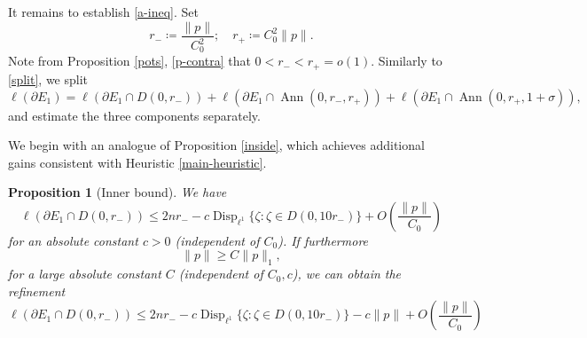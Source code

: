 \documentclass[12pt]{amsart}
\newtheorem{proposition}[theorem]{Proposition}
\newcommand{\Disp}{\operatorname{Disp}_{\ell^1}}
\newcommand{\Ann}{\operatorname{Ann}}
\begin{document}
It remains to establish \eqref{a-ineq}. Set
$$ r_- \coloneqq \frac{\|p\|}{C_0^2}; \quad r_+ \coloneqq C_0^2 \|p\|.$$
Note from Proposition \ref{pots}, \eqref{p-contra} that $0 < r_- < r_+ = o(1)$.
Similarly to \eqref{split}, we split
\begin{equation}\label{split-2}
 \ell(\partial E_1) = \ell(\partial E_1 \cap D(0,r_-)) + \ell(\partial E_1 \cap \Ann(0,r_-,r_+)) + \ell(\partial E_1 \cap \Ann(0,r_+,1+\sigma)),
\end{equation}
and estimate the three components separately.

We begin with an analogue of Proposition \ref{inside}, which achieves additional gains consistent with Heuristic \ref{main-heuristic}.

\begin{proposition}[Inner bound]\label{inside-2}  We have
\begin{equation}\label{in2-first}
     \ell(\partial E_1 \cap D(0,r_-)) \leq 2n r_- - c \Disp \{ \zeta : \zeta \in D(0,10 r_-) \} + O\left(\frac{\|p\|}{C_0}\right)
\end{equation}
for an absolute constant $c>0$ (independent of $C_0$).  If furthermore
\begin{equation}\label{pp0}
 \|p\| \geq C \|p\|_1,
\end{equation}
for a large absolute constant $C$ (independent of $C_0, c$), we can obtain the refinement
\begin{equation}\label{in2-second}
     \ell(\partial E_1 \cap D(0,r_-)) \leq 2n r_- - c \Disp \{ \zeta : \zeta \in D(0,10 r_-) \} - c \|p\| + O\left(\frac{\|p\|}{C_0}\right)
\end{equation}
\end{proposition}
\end{document}
